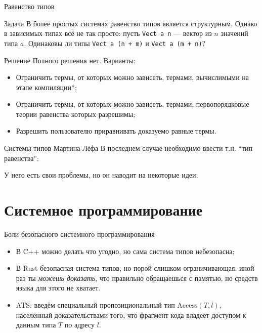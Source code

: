 \documentclass{beamer}
\begin{document}
\begin{frame}[fragile=singleslide]{Равенство типов}
  \begin{block}{Задача}
    В более простых системах равенство типов является структурным. Однако в
    зависимых типах всё не так просто: пусть \verb|Vect a n| --- вектор из $n$
    значений типа $a$. Одинаковы ли типы \verb|Vect a (n + m)| и
    \verb|Vect a (m + n)|?
  \end{block}
  \begin{block}{Решение}
    Полного решения нет. Варианты:
    \begin{itemize}
      \item Ограничить термы, от которых можно зависеть, термами,
        вычислимыми на этапе компиляции*;
      \item Ограничить термы, от которых можно зависеть, термами,
        первопорядковые теории равенства которых разрешимы;
      \item Разрешить пользователю приравнивать доказуемо равные термы.
    \end{itemize}
  \end{block}
\end{frame}

\begin{frame}{Системы типов Мартина-Лёфа}
  В последнем случае необходимо ввести т.н. ``тип равенства'':
  У него есть свои проблемы, но он наводит на некоторые идеи.
\end{frame}

\section{Системное программирование}

\frame{\sectionpage}

\begin{frame}{Боли безопасного системного программирования}
  \begin{itemize}
    \item В C++ можно делать что угодно, но сама система типов небезопасна;
    \item В Rust безопасная система типов, но порой слишком ограничивающая: иной
      раз ты \textit{можешь доказать}, что правильно обращаешься с памятью, но
      средств языка для этого не хватает.
    \item ATS: введём специальный пропозициональный тип $\text{Access}(T, l)$,
      населённый доказательствами того, что фрагмент кода владеет доступом к
      данным типа $T$ по адресу $l$.
  \end{itemize}
\end{frame}
\end{document}
